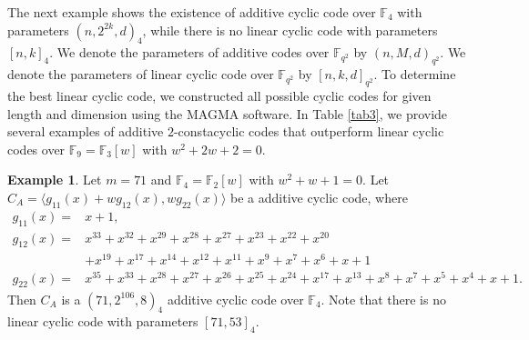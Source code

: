 \documentclass[12 pt]{extarticle}
\numberwithin{equation}{section}
\theoremstyle{definition}
\newtheorem{example}{Example}[section]
\begin{document}
The next example shows the existence of additive cyclic code over $\mathbb{F}_4$ with parameters $(n,2^{2k},d)_4$, while there is no linear cyclic code with parameters $[n,k]_4$. We denote the parameters of additive codes over $\mathbb{F}_{q^2}$ by $(n,M,d)_{q^2}$. We denote the parameters of linear cyclic code over $\mathbb{F}_{q^2}$ by $[n,k,d]_{q^2}$.  To determine the best linear cyclic code, we constructed all possible cyclic codes for given length and dimension using the MAGMA software. In Table \ref{tab3}, we provide several examples of additive $2$-constacyclic codes that outperform linear cyclic codes over $\mathbb{F}_9=\mathbb{F}_3[w]$ with $w^2+2w+2=0$.

\begin{example}
    Let $m=71$ and $\mathbb{F}_4=\mathbb{F}_2[w]$ with $w^2+w+1=0$. Let $C_A=\langle g_{11}(x)+wg_{12}(x),wg_{22}(x)\rangle$ be a additive cyclic code, where
    \begin{align*}
        g_{11}(x)=&x+1,\\
        g_{12}(x)=&x^{33} + x^{32} + x^{29} + x^{28} + x^{27} + x^{23} + x^{22} + x^{20} \\&+ x^{19} + x^{17}    + x^{14} + x^{12} + x^{11} + x^9 + x^7 + x^6 + x + 1\\
        g_{22}(x)=&x^{35} + x^{33} + x^{28} + x^{27} + x^{26} + x^{25} + x^{24} + x^{17} + x^{13} + x^8 + x^7 +
        x^5 + x^4 + x + 1.
    \end{align*}
 Then $C_A$ is  a $(71,2^{106},8)_4$ additive cyclic code over $\mathbb{F}_4$. Note that there is no linear cyclic code with parameters $[71,53]_4$.  
\end{example}
\end{document}
